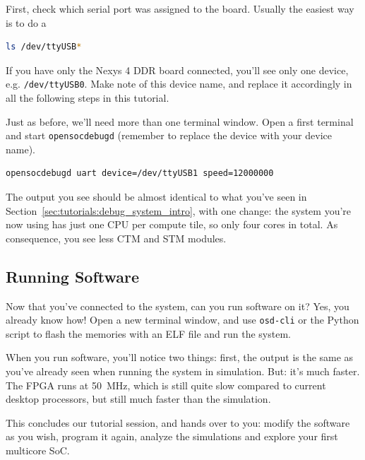 First, check which serial port was assigned to the board.
Usually the easiest way is to do a
\begin{lstlisting}[language=sh]
ls /dev/ttyUSB*
\end{lstlisting}

If you have only the Nexys 4 DDR board connected, you'll see only one device, e.g. \verb|/dev/ttyUSB0|.
Make note of this device name, and replace it accordingly in all the following steps in this tutorial.

Just as before, we'll need more than one terminal window.
Open a first terminal and start \verb|opensocdebugd| (remember to replace the device with your device name).
\begin{lstlisting}[language=sh]
opensocdebugd uart device=/dev/ttyUSB1 speed=12000000
\end{lstlisting}

The output you see should be almost identical to what you've seen in Section~\ref{sec:tutorials:debug_system_intro}, with one change:
the system you're now using has just one CPU per compute tile, so only four cores in total.
As consequence, you see less CTM and STM modules.

\subsection{Running Software}
Now that you've connected to the system, can you run software on it?
Yes, you already know how!
Open a new terminal window, and use \verb|osd-cli| or the Python script to flash the memories with an ELF file and run the system.

When you run software, you'll notice two things: first, the output is the same as you've already seen when running the system in simulation.
But: it's much faster. The FPGA runs at 50~MHz, which is still quite slow compared to current desktop processors, but still much faster than the simulation.

This concludes our tutorial session, and hands over to you:
modify the software as you wish, program it again, analyze the simulations and explore your first multicore SoC.
